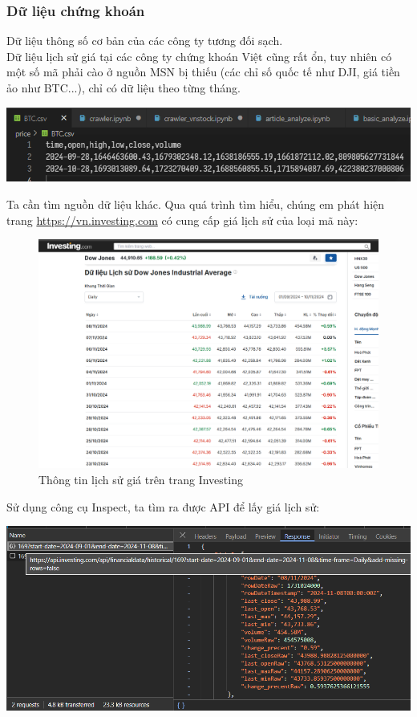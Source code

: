 \subsubsection*{Dữ liệu chứng khoán}
Dữ liệu thông số cơ bản của các công ty tương đối sạch.\\

Dữ liệu lịch sử giá tại các công ty chứng khoán Việt cũng rất ổn, tuy nhiên có một số mã phải cào ở nguồn MSN bị thiếu (các chỉ số quốc tế như DJI, giá tiền ảo như BTC...), chỉ có dữ liệu theo từng tháng.
\begin{center}
    \centering
    \includegraphics[width=0.75\linewidth]{images/code-1.23-abnormalex.png}
\end{center}

Ta cần tìm nguồn dữ liệu khác. Qua quá trình tìm hiểu, chúng em phát hiện trang \href{https://vn.investing.com}{https://vn.investing.com} có cung cấp giá lịch sử của loại mã này:

\begin{figure}[H]
    \centering
    \includegraphics[width=1\linewidth]{images/fig-1.3-investinghomepage.png}
    \caption{Thông tin lịch sử giá trên trang Investing}
    \label{fig:1.3}
\end{figure}

Sử dụng công cụ Inspect, ta tìm ra được API để lấy giá lịch sử:
\begin{center}
    \centering
    \includegraphics[width=0.9\linewidth]{images/code-1.24-inspectinv.png}
\end{center}

